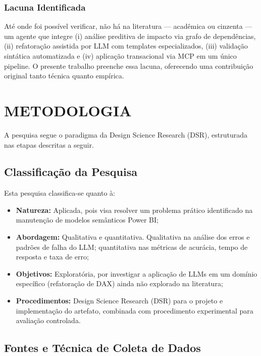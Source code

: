 \documentclass[
    12pt,               %
    openright,          %
    oneside,            %
    a4paper,            %
    chapter=TITLE,      %
    section=TITLE,      %
    brazil              %
]{abntex2}
\begin{document}
\subsection{Lacuna Identificada}

Até onde foi possível verificar, não há na literatura — acadêmica ou cinzenta — um agente que integre (i) análise preditiva de impacto via grafo de dependências, (ii) refatoração assistida por LLM com templates especializados, (iii) validação sintática automatizada e (iv) aplicação transacional via MCP em um único pipeline. O presente trabalho preenche essa lacuna, oferecendo uma contribuição original tanto técnica quanto empírica.

\chapter{METODOLOGIA}

A pesquisa segue o paradigma da Design Science Research (DSR), estruturada nas etapas descritas a seguir.

\section{Classificação da Pesquisa}

Esta pesquisa classifica-se quanto à:

\begin{itemize}
    \item \textbf{Natureza:} Aplicada, pois visa resolver um problema prático identificado na manutenção de modelos semânticos Power BI;
    \item \textbf{Abordagem:} Qualitativa e quantitativa. Qualitativa na análise dos erros e padrões de falha do LLM; quantitativa nas métricas de acurácia, tempo de resposta e taxa de erro;
    \item \textbf{Objetivos:} Exploratória, por investigar a aplicação de LLMs em um domínio específico (refatoração de DAX) ainda não explorado na literatura;
    \item \textbf{Procedimentos:} Design Science Research (DSR) para o projeto e implementação do artefato, combinada com procedimento experimental para avaliação controlada.
\end{itemize}

\section{Fontes e Técnica de Coleta de Dados}
\label{sec:fontes-dados}
\end{document}
